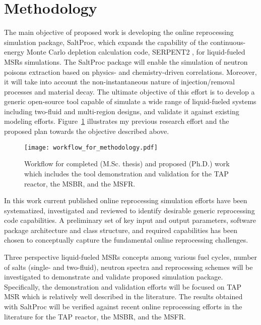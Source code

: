 \section{Methodology}
The main objective of proposed work is developing the online 
reprocessing simulation package, SaltProc, which expands the 
capability of the continuous-energy Monte Carlo depletion 
calculation code, SERPENT2 \cite{leppanen_serpent_2015}, for 
liquid-fueled \glspl{MSR} simulations. The SaltProc package 
will enable the simulation of neutron poisons extraction 
based on physics- and chemistry-driven correlations. 
Moreover, it will take into account the non-instantaneous 
nature of injection/removal processes and material decay. 
The ultimate objective of this effort is to develop a generic 
open-source tool capable of simulate a wide range of 
liquid-fueled systems including two-fluid and multi-region 
designs, and validate it against existing modeling efforts. 
Figure~\ref{fig:workflow_method} illustrates my previous 
research effort and the proposed plan towards the objective 
described above.
\begin{figure}[htp!] %
  \centering
	\texttt{[image: workflow\_for\_methodology.pdf]}
  \caption{Workflow for completed (M.Sc. thesis) and proposed (Ph.D.) work 
  which includes the tool demonstration and validation for the \gls{TAP} 
  reactor, the \gls{MSBR}, and the \gls{MSFR}.}
  \label{fig:workflow_method}
\end{figure}

In this work current published online reprocessing simulation efforts 
have been systematized, investigated and reviewed to identify desirable 
generic reprocessing code capabilities. A preliminary set of key input 
and output parameters, software package architecture and class 
structure, and required capabilities has been chosen to conceptually 
capture the fundamental online reprocessing challenges. 

Three perspective liquid-fueled \glspl{MSR} concepts among various 
fuel cycles, number of salts (single- and two-fluid), neutron 
spectra and reprocessing schemes will be investigated to 
demonstrate and validate proposed simulation package. Specifically, 
the demonstration and validation efforts will be focused on \gls{TAP} 
\gls{MSR} which is relatively well described in the literature. 
The results obtained with SaltProc will be verified against 
recent online reprocessing efforts in the literature for the 
\gls{TAP} reactor, the \gls{MSBR}, and the \gls{MSFR}. 